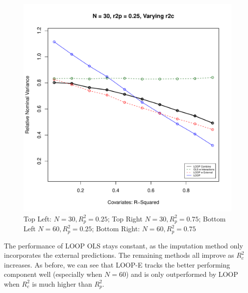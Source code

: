 \begin{figure}[H]
	\includegraphics[width=.49\linewidth,page = 4]{images/r2c.pdf} \quad
	\caption{Top Left: $N = 30, R^2_p = 0.25$; Top Right $N = 30, R^2_p = 0.75$; Bottom Left $N = 60, R^2_p = 0.25$; Bottom Right: $N = 60, R^2_p = 0.75$}  
\end{figure}
The performance of LOOP OLS stays constant, as the imputation method only incorporates the external predictions. The remaining methods all improve as $R^2_c$ increases. As before, we can see that LOOP-E tracks the better performing component well (especially when $N = 60$) and is only outperformed by LOOP when $R^2_c$ is much higher than $R^2_p$.

